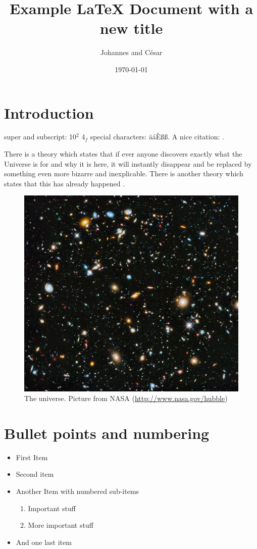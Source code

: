 \documentclass{article}
\title{Example \LaTeX{} Document with a new title}
\author{Johannes and César}
\date{\today}
\numberwithin{equation}{section}
\begin{document}
\maketitle

\newpage


\tableofcontents
\listoffigures
\listoftables

\newpage

\section{Introduction}\label{intro}
super and subscript: 10$^2$ 4$_f$ special characters: äáÈß\ss. A nice citation: \cite{hipsey_2019}.

There is a theory which states that if ever anyone discovers exactly what the Universe is for and why it is here, it will
instantly disappear and be replaced by something even more bizarre and inexplicable.
There is another theory which states that this has already happened  \citep{adams1995hitchhiker}.


\begin{figure}[t]
\centering
\includegraphics[width=0.5\linewidth]{universe.jpg}
\caption[The Universe]{The universe. Picture from NASA (\url{http://www.nasa.gov/hubble})}
\label{fig:galaxy}
\end{figure}

\section{Bullet points and numbering}

\begin{itemize}
    \item First Item
    \item Second item
    \item Another Item with numbered sub-items
    \begin{enumerate}
        \item Important stuff
        \item More important stuff
    \end{enumerate}
    \item And one last item
\end{itemize}
\end{document}
